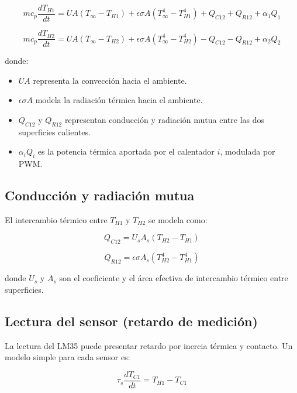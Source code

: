 \documentclass[letterpaper,12pt]{article}
\begin{document}
\begin{equation}
    m c_p \frac{dT_{H1}}{dt} = UA(T_{\infty} - T_{H1}) + \epsilon \sigma A \left(T_{\infty}^4 - T_{H1}^4\right) + Q_{C12} + Q_{R12} + \alpha_1 Q_1
\end{equation}

\begin{equation}
    m c_p \frac{dT_{H2}}{dt} = UA(T_{\infty} - T_{H2}) + \epsilon \sigma A \left(T_{\infty}^4 - T_{H2}^4\right) - Q_{C12} - Q_{R12} + \alpha_2 Q_2
\end{equation}

donde:

\begin{itemize}
    \item $UA$ representa la convección hacia el ambiente.
    \item $\epsilon \sigma A$ modela la radiación térmica hacia el ambiente.
    \item $Q_{C12}$ y $Q_{R12}$ representan conducción y radiación mutua entre las dos superficies calientes.
    \item $\alpha_i Q_i$ es la potencia térmica aportada por el calentador $i$, modulada por PWM.
\end{itemize}

\subsection*{Conducción y radiación mutua}
El intercambio térmico entre $T_{H1}$ y $T_{H2}$ se modela como:

\begin{equation}
    Q_{C12} = U_s A_s (T_{H2} - T_{H1})
\end{equation}

\begin{equation}
    Q_{R12} = \epsilon \sigma A_s \left(T_{H2}^4 - T_{H1}^4\right)
\end{equation}

donde $U_s$ y $A_s$ son el coeficiente y el área efectiva de intercambio térmico entre superficies.

\subsection*{Lectura del sensor (retardo de medición)}
La lectura del LM35 puede presentar retardo por inercia térmica y contacto. Un modelo simple para cada sensor es:

\begin{equation}
    \tau_s \frac{dT_{C1}}{dt} = T_{H1} - T_{C1}
\end{equation}
\end{document}
